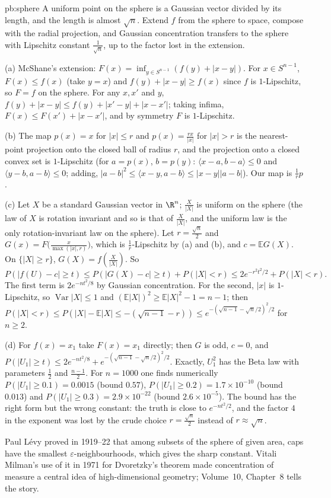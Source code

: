 \begin{solution}{pb:sphere}
\idea A uniform point on the sphere is a Gaussian vector divided by its length, and the length is almost $\sqrt n$. Extend $f$ from the sphere to space, compose with the radial
projection, and Gaussian concentration transfers to the sphere with Lipschitz constant $\frac1{\sqrt n}$, up to the factor lost in the extension.

\writeup (a) McShane's extension: $F(x)=\inf_{y\in S^{n-1}}(f(y)+|x-y|)$. For $x\in S^{n-1}$, $F(x)\le f(x)$ (take $y=x$) and $f(y)+|x-y|\ge f(x)$ since $f$ is $1$-Lipschitz, so $F=f$ on the
sphere. For any $x,x'$ and $y$, $f(y)+|x-y|\le f(y)+|x'-y|+|x-x'|$; taking infima, $F(x)\le F(x')+|x-x'|$, and by symmetry $F$ is $1$-Lipschitz.

(b) The map $p(x)=x$ for $|x|\le r$ and $p(x)=\frac{rx}{|x|}$ for $|x|>r$ is the nearest-point projection onto the closed ball of radius $r$, and the projection onto a closed
convex set is $1$-Lipschitz (for $a=p(x)$, $b=p(y)$: $\langle x-a,b-a\rangle\le0$ and $\langle y-b,a-b\rangle\le0$; adding, $|a-b|^2\le\langle x-y,a-b\rangle\le|x-y||a-b|$). Our map
is $\frac1rp$.

(c) Let $X$ be a standard Gaussian vector in $\R^n$; $\frac X{|X|}$ is uniform on the sphere (the law of $X$ is rotation invariant and so is that of $\frac X{|X|}$, and the uniform
law is the only rotation-invariant law on the sphere). Let $r=\frac{\sqrt n}2$ and $G(x)=F\bigl(\frac x{\max(|x|,r)}\bigr)$, which is $\frac1r$-Lipschitz by (a) and (b), and $c=\mathbb EG(X)$.
On $\{|X|\ge r\}$, $G(X)=f(\frac X{|X|})$. So
\[
P(|f(U)-c|\ge t)\le P(|G(X)-c|\ge t)+P(|X|<r)\le2e^{-r^2t^2/2}+P(|X|<r).
\]
The first term is $2e^{-nt^2/8}$ by Gaussian concentration. For the second, $|x|$ is $1$-Lipschitz, so $\operatorname{Var}|X|\le1$ and $(\mathbb E|X|)^2\ge\mathbb E|X|^2-1=n-1$; then
$P(|X|<r)\le P(|X|-\mathbb E|X|\le-(\sqrt{n-1}-r))\le e^{-(\sqrt{n-1}-\sqrt n/2)^2/2}$ for $n\ge2$.

(d) For $f(x)=x_1$ take $F(x)=x_1$ directly; then $G$ is odd, $c=0$, and $P(|U_1|\ge t)\le2e^{-nt^2/8}+e^{-(\sqrt{n-1}-\sqrt n/2)^2/2}$. Exactly, $U_1^2$ has the Beta law with
parameters $\frac12$ and $\frac{n-1}2$. For $n=1000$ one finds numerically $P(|U_1|\ge0.1)=0.0015$ (bound $0.57$), $P(|U_1|\ge0.2)=1.7\times10^{-10}$ (bound $0.013$) and
$P(|U_1|\ge0.3)=2.9\times10^{-22}$ (bound $2.6\times10^{-5}$). The bound has the right form but the wrong constant: the truth is close to $e^{-nt^2/2}$, and the factor $4$ in the
exponent was lost by the crude choice $r=\frac{\sqrt n}2$ instead of $r\approx\sqrt n$.

\leads Paul L\'evy proved in 1919--22 that among subsets of the sphere of given area, caps have the smallest $\varepsilon$-neighbourhoods, which gives the sharp constant. Vitali
Milman's use of it in 1971 for Dvoretzky's theorem made concentration of measure a central idea of high-dimensional geometry; Volume~10, Chapter~8 tells the story.
\end{solution}

